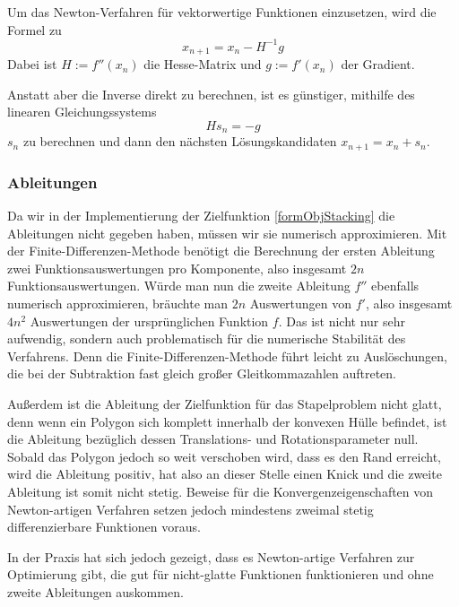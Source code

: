 \documentclass[runningheads,a4paper]{llncs}
\begin{document}
Um das Newton-Verfahren für vektorwertige Funktionen einzusetzen, wird die Formel zu
\begin{equation}
\label{eq:ndimnewtonstep}
x_{n+1} = x_n - H^{-1}g
\end{equation}
Dabei ist $H := f''(x_n)$ die Hesse-Matrix und $g := f'(x_n)$ der Gradient.

Anstatt aber die Inverse direkt zu berechnen, ist es günstiger, mithilfe des linearen Gleichungssystems
\begin{equation}
\label{eq:newtonlineq}
Hs_n=-g
\end{equation}
$s_n$ zu berechnen und dann den nächsten Lösungskandidaten ${x_{n+1} = x_n + s_n}$.

\subsubsection{Ableitungen}
Da wir in der Implementierung der Zielfunktion \ref{formObjStacking} die Ableitungen nicht gegeben haben, müssen wir sie numerisch approximieren. Mit der Finite-Differenzen-Methode benötigt die Berechnung der ersten Ableitung zwei Funktionsauswertungen pro Komponente, also insgesamt $2n$ Funktionsauswertungen. Würde man nun die zweite Ableitung $f''$ ebenfalls numerisch approximieren, bräuchte man $2n$ Auswertungen von $f'$, also insgesamt $4n^2$ Auswertungen der ursprünglichen Funktion $f$. Das ist nicht nur sehr aufwendig, sondern auch problematisch für die numerische Stabilität des Verfahrens. Denn die Finite-Differenzen-Methode führt leicht zu Auslöschungen, die bei der Subtraktion fast gleich großer Gleitkommazahlen auftreten.

Außerdem ist die Ableitung der Zielfunktion für das Stapelproblem nicht glatt, denn wenn ein Polygon sich komplett innerhalb der konvexen Hülle befindet, ist die Ableitung bezüglich dessen Translations- und Rotationsparameter null. Sobald das Polygon jedoch so weit verschoben wird, dass es den Rand erreicht, wird die Ableitung positiv, hat also an dieser Stelle einen Knick und die zweite Ableitung ist somit nicht stetig. Beweise für die Konvergenzeigenschaften von Newton-artigen Verfahren setzen jedoch mindestens zweimal stetig differenzierbare Funktionen voraus.

In der Praxis hat sich jedoch gezeigt, dass es Newton-artige Verfahren zur Optimierung gibt, die gut für nicht-glatte Funktionen funktionieren \cite{DBLP:journals/mp/LewisO13} und ohne zweite Ableitungen auskommen.
\end{document}
